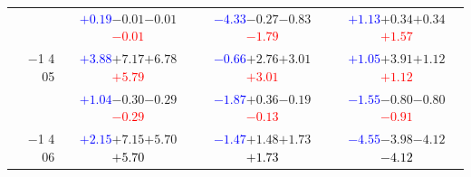 \documentclass[compress]{beamer}
\begin{document}
\begin{frame}
\begin{tabular}{r | c | c | c}
          & \textcolor{blue}{$+0.19$}\hspace{0.1 cm}$-0.01$\hspace{0.1 cm}$-0.01$\hspace{0.1 cm}\textcolor{red}{$-0.01$} & \textcolor{blue}{$-4.33$}\hspace{0.1 cm}$-0.27$\hspace{0.1 cm}$-0.83$\hspace{0.1 cm}\textcolor{red}{$-1.79$} & \textcolor{blue}{$+1.13$}\hspace{0.1 cm}$+0.34$\hspace{0.1 cm}$+0.34$\hspace{0.1 cm}\textcolor{red}{$+1.57$} \\
$-$1 4 05 & \textcolor{blue}{$+3.88$}\hspace{0.1 cm}$+7.17$\hspace{0.1 cm}$+6.78$\hspace{0.1 cm}\textcolor{red}{$+5.79$} & \textcolor{blue}{$-0.66$}\hspace{0.1 cm}$+2.76$\hspace{0.1 cm}$+3.01$\hspace{0.1 cm}\textcolor{red}{$+3.01$} & \textcolor{blue}{$+1.05$}\hspace{0.1 cm}$+3.91$\hspace{0.1 cm}$+1.12$\hspace{0.1 cm}\textcolor{red}{$+1.12$} \\
          & \textcolor{blue}{$+1.04$}\hspace{0.1 cm}$-0.30$\hspace{0.1 cm}$-0.29$\hspace{0.1 cm}\textcolor{red}{$-0.29$} & \textcolor{blue}{$-1.87$}\hspace{0.1 cm}$+0.36$\hspace{0.1 cm}$-0.19$\hspace{0.1 cm}\textcolor{red}{$-0.13$} & \textcolor{blue}{$-1.55$}\hspace{0.1 cm}$-0.80$\hspace{0.1 cm}$-0.80$\hspace{0.1 cm}\textcolor{red}{$-0.91$} \\
$-$1 4 06 & \textcolor{blue}{$+2.15$}\hspace{0.1 cm}$+7.15$\hspace{0.1 cm}$+5.70$\hspace{0.1 cm}\textcolor{black}{$+5.70$} & \textcolor{blue}{$-1.47$}\hspace{0.1 cm}$+1.48$\hspace{0.1 cm}$+1.73$\hspace{0.1 cm}\textcolor{black}{$+1.73$} & \textcolor{blue}{$-4.55$}\hspace{0.1 cm}$-3.98$\hspace{0.1 cm}$-4.12$\hspace{0.1 cm}\textcolor{black}{$-4.12$} \\

\end{tabular}
\end{frame}
\end{document}
